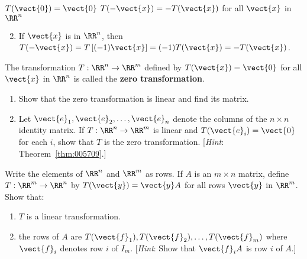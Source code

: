 \begin{multicols}{2}
\begin{ex}
\begin{exenumerate}[column-sep=-5em]
\exitem $T(\vect{0}) = \vect{0}$
\exitem $T(-\vect{x}) = -T(\vect{x})$ for all $\vect{x}$ in $\RR^n$
\end{exenumerate}
\begin{sol}
\begin{enumerate}[label={\alph*.}]
\setcounter{enumi}{1}
\item  If $\vect{x}$ is in $\RR^n$, then $T(-\vect{x}) = T\left[(-1)\vect{x}\right] = (-1)T(\vect{x}) = -T(\vect{x})$.

\end{enumerate}
\end{sol}
\end{ex}

\begin{ex}
The transformation $T : \RR^n \to \RR^m$ defined by $T(\vect{x}) = \vect{0}$ for all $\vect{x}$ in $\RR^n$ is called the \textbf{zero transformation}.

\begin{enumerate}[label={\alph*.}]
\item Show that the zero transformation is linear and find its matrix.

\item Let $\vect{e}_{1}, \vect{e}_{2}, \dots, \vect{e}_{n}$ denote the columns of the $n \times n$ identity matrix. If $T : \RR^n \to \RR^m$ is linear and $T(\vect{e}_{i}) = \vect{0}$ for each $i$, show that $T$ is the zero transformation. [\textit{Hint}: Theorem~\ref{thm:005709}.]

\end{enumerate}
\end{ex}

\begin{ex}
Write the elements of $\RR^n$ and $\RR^m$ as rows. If $A$ is an $m \times n$ matrix, define $T : \RR^m \to \RR^n$ by $T(\vect{y}) = \vect{y}A$ for all rows $\vect{y}$ in $\RR^m$. Show that:

\begin{enumerate}[label={\alph*.}]
\item $T$ is a linear transformation.

\item the rows of $A$ are $T(\vect{f}_{1}), T(\vect{f}_{2}), \dots, T(\vect{f}_{m})$ where $\vect{f}_{i}$ denotes row $i$ of $I_{m}$. [\textit{Hint}: Show that $\vect{f}_{i} A$ is row $i$ of $A$.]

\end{enumerate}
\end{ex}


\end{multicols}
